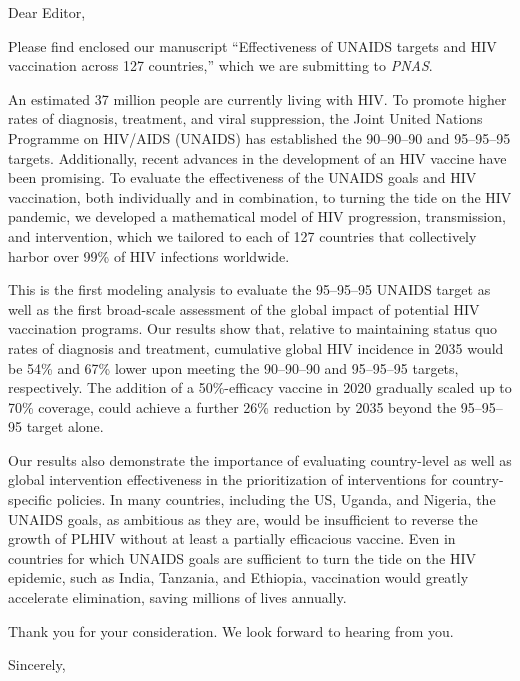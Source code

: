 \documentclass[12pt]{jpmletter}
\begin{document}
  \begin{letter}{}

    \opening{Dear Editor,}
 
    Please find enclosed our manuscript ``Effectiveness of UNAIDS
    targets and HIV vaccination across 127 countries,'' which we are
    submitting to \textit{PNAS}.
 
    An estimated 37 million people are currently living with HIV. To
    promote higher rates of diagnosis, treatment, and viral
    suppression, the Joint United Nations Programme on HIV/AIDS
    (UNAIDS) has established the 90–90–90 and 95–95–95
    targets. Additionally, recent advances in the development of an
    HIV vaccine have been promising. To evaluate the effectiveness of
    the UNAIDS goals and HIV vaccination, both individually and in
    combination, to turning the tide on the HIV pandemic, we developed
    a mathematical model of HIV progression, transmission, and
    intervention, which we tailored to each of 127 countries that
    collectively harbor over 99\% of HIV infections worldwide.

    This is the first modeling analysis to evaluate the 95–95–95
    UNAIDS target as well as the first broad-scale assessment of the
    global impact of potential HIV vaccination programs. Our results
    show that, relative to maintaining status quo rates of diagnosis
    and treatment, cumulative global HIV incidence in 2035 would be
    54\% and 67\% lower upon meeting the 90–90–90 and 95–95–95
    targets, respectively. The addition of a 50\%-efficacy vaccine in
    2020 gradually scaled up to 70\% coverage, could achieve a further
    26\% reduction by 2035 beyond the 95–95–95 target alone.

    Our results also demonstrate the importance of evaluating
    country-level as well as global intervention effectiveness in the
    prioritization of interventions for country-specific policies. In
    many countries, including the US, Uganda, and Nigeria, the UNAIDS
    goals, as ambitious as they are, would be insufficient to reverse
    the growth of PLHIV without at least a partially efficacious
    vaccine. Even in countries for which UNAIDS goals are sufficient
    to turn the tide on the HIV epidemic, such as India, Tanzania, and
    Ethiopia, vaccination would greatly accelerate elimination, saving
    millions of lives annually.
 
    Thank you for your consideration. We look forward to hearing from
    you.

    \closing{Sincerely,}

  \end{letter}
\end{document}
